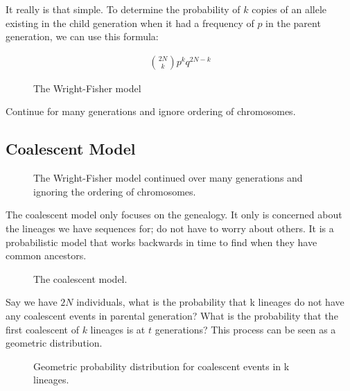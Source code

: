 It really is that simple. To determine the probability of $k$ copies of an allele
existing in the child generation when it had a frequency of $p$ in the parent
generation, we can use this formula:

\begin{align}
\binom{2N}{k} p^{k} q^{2N-k}
\end{align}

\begin{figure} [ht!] 
  \centering 
  \caption{The Wright-Fisher model}
  \label{Fig13_FisherWrightModel}
\end{figure} 

\noindent Continue for many generations and ignore ordering of chromosomes.

\subsection{Coalescent Model}



\begin{figure} [ht!] 
  \centering 
  \caption{The Wright-Fisher model continued over many generations and
    ignoring the ordering of chromosomes.}
  \label{Fig14_FisherWrightManyGenerations}
\end{figure} 

The coalescent model only focuses on the genealogy. It only is
concerned about the lineages we have sequences for; do not have to
worry about others. It is a probabilistic model that works backwards
in time to find when they have common ancestors.

\begin{figure} [ht!] 
  \centering 
  \caption{The coalescent model.}
  \label{Fig15_CoalescentModel}
\end{figure} 

Say we have $2N$ individuals, what is the probability that k lineages
do not have any coalescent events in parental generation? What is the
probability that the first coalescent of $k$ lineages is at $t$
generations? This process can be seen as a geometric distribution.

\begin{figure} [ht!] 
  \centering 
  \caption{Geometric probability distribution for coalescent events in k lineages.}
  \label{Fig16_CoalescentProbDist}
\end{figure} 

